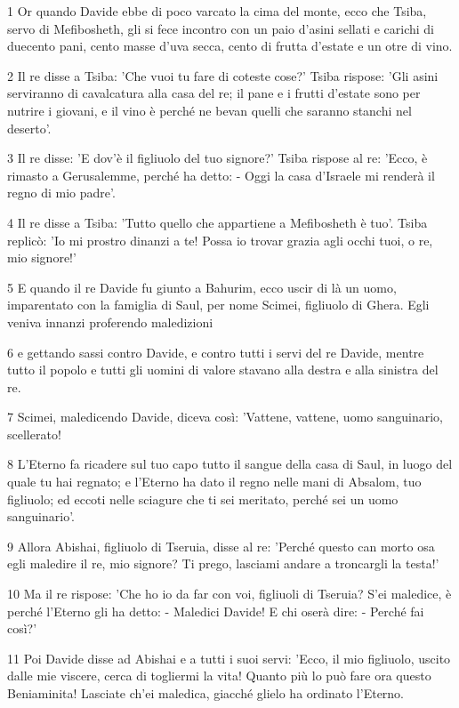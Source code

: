 \par 1 Or quando Davide ebbe di poco varcato la cima del monte, ecco che Tsiba, servo di Mefibosheth, gli si fece incontro con un paio d'asini sellati e carichi di duecento pani, cento masse d'uva secca, cento di frutta d'estate e un otre di vino.
\par 2 Il re disse a Tsiba: 'Che vuoi tu fare di coteste cose?' Tsiba rispose: 'Gli asini serviranno di cavalcatura alla casa del re; il pane e i frutti d'estate sono per nutrire i giovani, e il vino è perché ne bevan quelli che saranno stanchi nel deserto'.
\par 3 Il re disse: 'E dov'è il figliuolo del tuo signore?' Tsiba rispose al re: 'Ecco, è rimasto a Gerusalemme, perché ha detto: - Oggi la casa d'Israele mi renderà il regno di mio padre'.
\par 4 Il re disse a Tsiba: 'Tutto quello che appartiene a Mefibosheth è tuo'. Tsiba replicò: 'Io mi prostro dinanzi a te! Possa io trovar grazia agli occhi tuoi, o re, mio signore!'
\par 5 E quando il re Davide fu giunto a Bahurim, ecco uscir di là un uomo, imparentato con la famiglia di Saul, per nome Scimei, figliuolo di Ghera. Egli veniva innanzi proferendo maledizioni
\par 6 e gettando sassi contro Davide, e contro tutti i servi del re Davide, mentre tutto il popolo e tutti gli uomini di valore stavano alla destra e alla sinistra del re.
\par 7 Scimei, maledicendo Davide, diceva così: 'Vattene, vattene, uomo sanguinario, scellerato!
\par 8 L'Eterno fa ricadere sul tuo capo tutto il sangue della casa di Saul, in luogo del quale tu hai regnato; e l'Eterno ha dato il regno nelle mani di Absalom, tuo figliuolo; ed eccoti nelle sciagure che ti sei meritato, perché sei un uomo sanguinario'.
\par 9 Allora Abishai, figliuolo di Tseruia, disse al re: 'Perché questo can morto osa egli maledire il re, mio signore? Ti prego, lasciami andare a troncargli la testa!'
\par 10 Ma il re rispose: 'Che ho io da far con voi, figliuoli di Tseruia? S'ei maledice, è perché l'Eterno gli ha detto: - Maledici Davide! E chi oserà dire: - Perché fai così?'
\par 11 Poi Davide disse ad Abishai e a tutti i suoi servi: 'Ecco, il mio figliuolo, uscito dalle mie viscere, cerca di togliermi la vita! Quanto più lo può fare ora questo Beniaminita! Lasciate ch'ei maledica, giacché glielo ha ordinato l'Eterno.

